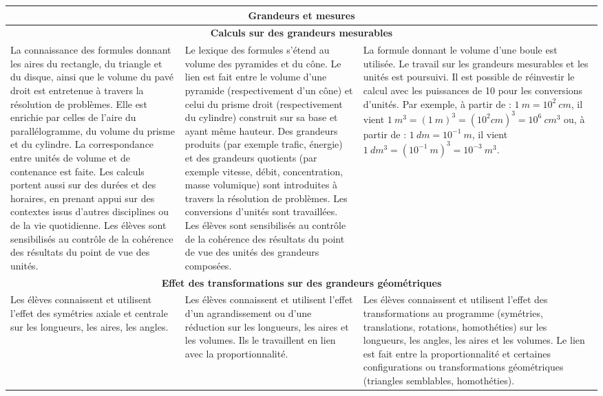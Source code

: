 \documentclass[11pt]{article}
\newcommand{\categorie}[1]{\hline\multicolumn{3}{|c|}{\color{white}\LARGE\cellcolor{bleu}\sffamily\phantom{É} #1 \phantom{É}}\rmfamily \\\hline}
\newcommand{\souscategorie}[1]{\hline\multicolumn{3}{|c|}{\color{bleu}\Large\bf\rmfamily\phantom{É}#1\phantom{É}\rmfamily}\\\hline}
\newenvironment{programme}
{
    \setlength{\arrayrulewidth}{0.5pt}
    \arrayrulecolor{bleu}
    \begin{center}
    \begin{tabular}{|p{6.4cm}|p{6.4cm}|p{6.4cm}|}
}
{
    \hline
    \end{tabular}
    \end{center}
}
\begin{document}
\begin{programme}
    \categorie{Grandeurs et mesures}
    \souscategorie{Calculs sur des grandeurs mesurables}
    La connaissance des formules donnant les aires du rectangle, du triangle et du disque, ainsi que le volume du pavé droit est entretenue à travers la résolution de problèmes. Elle est enrichie par celles de l’aire du parallélogramme, du volume du prisme et du cylindre. La correspondance entre unités de volume et de contenance est faite. Les calculs portent aussi sur des durées et des horaires, en prenant appui sur des contextes issus d’autres disciplines ou de la vie quotidienne. Les élèves sont sensibilisés au contrôle de la cohérence des résultats du point de vue des unités. & Le lexique des formules s’étend au volume des pyramides et du cône. Le lien est fait entre le volume d’une pyramide (respectivement d’un cône) et celui du prisme droit (respectivement du cylindre) construit sur sa base et ayant même hauteur. Des grandeurs produits (par exemple trafic, énergie) et des grandeurs quotients (par exemple vitesse, débit, concentration, masse volumique) sont introduites à travers la résolution de problèmes. Les conversions d’unités sont travaillées. Les élèves sont sensibilisés au contrôle de la cohérence des résultats du point de vue des unités des grandeurs composées. & La formule donnant le volume d’une boule est utilisée. Le travail sur les grandeurs mesurables et les unités est poursuivi. Il est possible de réinvestir le calcul avec les puissances de 10 pour les conversions d’unités. Par exemple, à partir de : $1~m = 10^2~cm$, il vient $1~m^3 = (1~m)^3 = (10^2 cm)^3 = 10^6~cm^3$ ou, à partir de : $1~dm = 10^{-1}~m$, il vient $1~dm^3 = (10^{-1}~m)^3 = 10^{-3}~m^3$.\\
    \souscategorie{Effet des transformations sur des grandeurs géométriques} 
    Les élèves connaissent et utilisent l’effet des symétries axiale et centrale sur les longueurs, les aires, les angles. & Les élèves connaissent et utilisent l’effet d’un agrandissement ou d’une réduction sur les longueurs, les aires et les volumes. Ils le travaillent en lien avec la proportionnalité. & Les élèves connaissent et utilisent l’effet des transformations au programme (symétries, translations, rotations, homothéties) sur les longueurs, les angles, les aires et les volumes. Le lien est fait entre la proportionnalité et certaines configurations ou transformations géométriques (triangles semblables, homothéties). \\
\end{programme}
\end{document}
